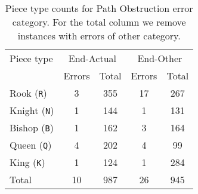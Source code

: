 \documentclass[12pt]{thesis-umich}[thesis]
\newcommand{\pos}[1]{\texttt{#1}}
\begin{document}
\begin{table}[t]
	
\end{table}

\begin{table}[ht]
	\caption{Piece type counts for Path Obstruction error category. For the total column we remove instances with errors of other category.}
	\label{tab:path_obs}
	\centering
	\begin{tabular}{lcccc}
		\toprule
		Piece type & \multicolumn{2}{c}{End-Actual} & \multicolumn{2}{c}{End-Other} \\ & Errors & Total & Errors & Total \\
		\midrule
		Rook (\pos{R}) 	& 	3 	& 355	& 17  			& 267    		\\ 
		Knight (\pos{N}) 	& 	1  	& 144	& \phantom{1}1 	& 131 			\\  
		Bishop (\pos{B}) 	& 	1 	& 162	& \phantom{1}3 	& 164 			\\
		Queen (\pos{Q}) 	& 	4  	& 202	& \phantom{1}4  & \phantom{1}99	\\ 
		King (\pos{K}) 	& 	1  	& 124 	& \phantom{1}1  & 284			\\
		\midrule
		Total 		& 	10 	& 987  	& 26 			& 945\\\bottomrule
	\end{tabular}
\end{table}
\end{document}
